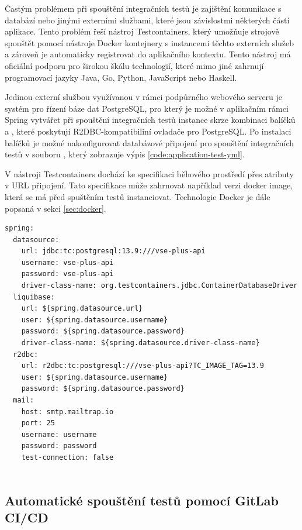 Častým problémem při spouštění integračních testů je zajištění komunikace s databází nebo jinými externími službami, které jsou závislostmi některých částí aplikace. Tento problém řeší nástroj Testcontainers, který umožňuje strojově spouštět pomocí nástroje Docker kontejnery s instancemi těchto externích služeb a zároveň je automaticky registrovat do aplikačního kontextu. Tento nástroj má oficiální podporu pro širokou škálu technologií, které mimo jiné zahrnují programovací jazyky Java, Go, Python, JavaScript nebo Haskell.

Jedinou externí službou využívanou v rámci podpůrného webového serveru je systém pro řízení báze dat PostgreSQL, pro který je možné v aplikačním rámci Spring vytvářet při spouštění integračních testů instance skrze kombinaci balíčků  a , které poskytují R2DBC-kompatibiliní ovladače pro PostgreSQL. Po instalaci balíčků je možné nakonfigurovat databázové připojení pro spouštění integračních testů v souboru , který zobrazuje výpis \ref{code:application-test-yml}.

V nástroji Testcontainers dochází ke specifikaci běhového prostředí přes atributy v URL připojení. Tato specifikace může zahrnovat například verzi docker image, která se má před spuštěním testů instanciovat. Technologie Docker je dále popsaná v sekci \ref{sec:docker}.

\begin{lstlisting}[label={code:application-test-yml}, caption={Konfigurace prostředí pro spouštění testů s využitím testcontainers (vlastní zpracování)}]
spring:
  datasource:
    url: jdbc:tc:postgresql:13.9:///vse-plus-api
    username: vse-plus-api
    password: vse-plus-api
    driver-class-name: org.testcontainers.jdbc.ContainerDatabaseDriver
  liquibase:
    url: ${spring.datasource.url}
    user: ${spring.datasource.username}
    password: ${spring.datasource.password}
    driver-class-name: ${spring.datasource.driver-class-name}
  r2dbc:
    url: r2dbc:tc:postgresql:///vse-plus-api?TC_IMAGE_TAG=13.9
    user: ${spring.datasource.username}
    password: ${spring.datasource.password}
  mail:
    host: smtp.mailtrap.io
    port: 25
    username: username
    password: password
    test-connection: false
 
\end{lstlisting}

\subsection{Automatické spouštění testů pomocí GitLab CI/CD}

